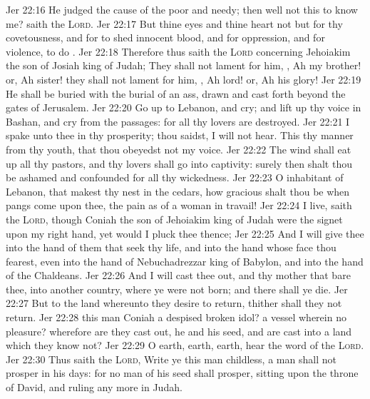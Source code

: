 \vs Jer 22:16 He judged the cause of the poor and needy; then  well  not this to know me? saith the \textsc{Lord}.
\vs Jer 22:17 But thine eyes and thine heart  not but for thy covetousness, and for to shed innocent blood, and for oppression, and for violence, to do .
\vs Jer 22:18 Therefore thus saith the \textsc{Lord} concerning Jehoiakim the son of Josiah king of Judah; They shall not lament for him, , Ah my brother! or, Ah sister! they shall not lament for him, , Ah lord! or, Ah his glory!
\vs Jer 22:19 He shall be buried with the burial of an ass, drawn and cast forth beyond the gates of Jerusalem.
\vs Jer 22:20 Go up to Lebanon, and cry; and lift up thy voice in Bashan, and cry from the passages: for all thy lovers are destroyed.
\vs Jer 22:21 I spake unto thee in thy prosperity;  thou saidst, I will not hear. This  thy manner from thy youth, that thou obeyedst not my voice.
\vs Jer 22:22 The wind shall eat up all thy pastors, and thy lovers shall go into captivity: surely then shalt thou be ashamed and confounded for all thy wickedness.
\vs Jer 22:23 O inhabitant of Lebanon, that makest thy nest in the cedars, how gracious shalt thou be when pangs come upon thee, the pain as of a woman in travail!
\vs Jer 22:24  I live, saith the \textsc{Lord}, though Coniah the son of Jehoiakim king of Judah were the signet upon my right hand, yet would I pluck thee thence;
\vs Jer 22:25 And I will give thee into the hand of them that seek thy life, and into the hand  whose face thou fearest, even into the hand of Nebuchadrezzar king of Babylon, and into the hand of the Chaldeans.
\vs Jer 22:26 And I will cast thee out, and thy mother that bare thee, into another country, where ye were not born; and there shall ye die.
\vs Jer 22:27 But to the land whereunto they desire to return, thither shall they not return.
\vs Jer 22:28  this man Coniah a despised broken idol?  a vessel wherein  no pleasure? wherefore are they cast out, he and his seed, and are cast into a land which they know not?
\vs Jer 22:29 O earth, earth, earth, hear the word of the \textsc{Lord}.
\vs Jer 22:30 Thus saith the \textsc{Lord}, Write ye this man childless, a man  shall not prosper in his days: for no man of his seed shall prosper, sitting upon the throne of David, and ruling any more in Judah.
